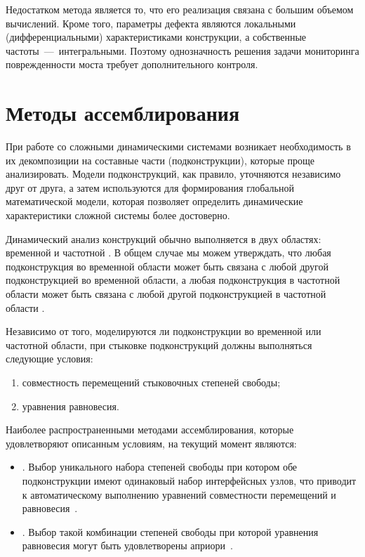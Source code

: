Недостатком метода является то, что его реализация связана с большим объемом вычислений. Кроме того, параметры дефекта являются локальными (дифференциальными) характеристиками конструкции, а собственные частоты~---~интегральными. Поэтому однозначность решения задачи мониторинга поврежденности моста требует дополнительного контроля. 

\section{Методы ассемблирования}

При работе со сложными динамическими системами возникает необходимость в их декомпозиции на составные части (подконструкции), которые проще анализировать. Модели подконструкций, как правило, уточняются независимо друг от друга, а затем используются для формирования глобальной математической модели, которая позволяет определить динамические характеристики сложной системы более достоверно.

Динамический анализ конструкций обычно выполняется в двух областях: временной \cite{lib:coupling:Dong&Shuo, lib:coupling:Gram-Schmidt} и частотной \cite{lib:coupling:Peeters}. В общем случае мы можем утверждать, что любая подконструкция во временной области может быть связана с любой другой подконструкцией во временной области, а любая подконструкция в частотной области может быть связана с любой другой подконструкцией в частотной области \cite{lib:coupling:Valk}. 

Независимо от того, моделируются ли подконструкции во временной или частотной области, при стыковке подконструкций должны выполняться следующие условия:
\begin{enumerate}[noitemsep]
	\item совместность перемещений стыковочных степеней свободы;
	\item уравнения равновесия. 
\end{enumerate}

Наиболее распространенными методами ассемблирования, которые удовлетворяют описанным условиям, на текущий момент являются:
\begin{itemize}
	\item {}. Выбор уникального набора степеней свободы при котором обе подконструкции имеют одинаковый набор интерфейсных узлов, что приводит к автоматическому выполнению уравнений совместности перемещений и равновесия~\cite{lib:coupling:Fregolent}.
	\item {}. Выбор такой комбинации степеней свободы при которой уравнения равновесия  могут быть удовлетворены априори~\cite{lib:coupling:DAmbrogio}.
\end{itemize}

